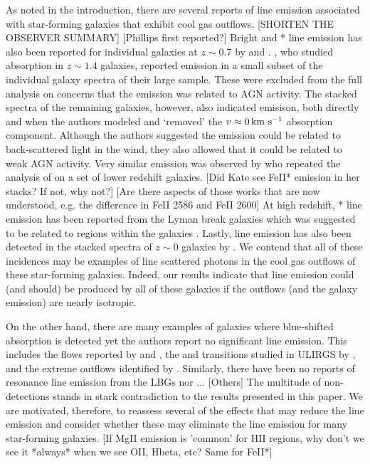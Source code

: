 \documentclass[12pt,preprint]{aastex}
\begin{document}
As noted in the introduction, there are several reports of line
emission associated with star-forming galaxies that exhibit cool gas outflows.  
[SHORTEN THE OBSERVER SUMMARY]
[Phillips first reported?]
Bright  and * line emission has also been
reported for individual galaxies at $z \sim 0.7$ by \cite{rubin+10b}
and \cite{rubin+10c}.   
\cite{wcp+09}, who
studied  absorption in $z \sim 1.4$ galaxies, reported
 emission in a small subset of the individual galaxy
spectra of their large sample.  These were excluded from the full
analysis on concerns that the emission was related to AGN activity.
The stacked spectra of the remaining galaxies, however, also indicated
 emisison, both directly and when the authors modeled and
`removed' the $v \approx 0\, {\rm km~s^{-1}}$ absorption component.  Although the
authors suggested the emission could be related to back-scattered
light in the wind, they also allowed that it could be related to weak
AGN activity.   Very similar  emission was observed by
\cite{rubin+10b} who repeated the analysis of \cite{wcp+09} on a set
of lower redshift galaxies. 
[Did Kate see FeII* emission in her stacks? If not, why not?]
[Are there aspects of those works that are now understood, e.g. the
difference in FeII 2586 and FeII 2600]
At high redshift, * line emission has been reported from
the Lyman break galaxies which was suggested to be
related to  regions within the galaxies \citep{shapley03}.
Lastly,  line emission has also been detected in the
stacked spectra of $z \sim 0$ galaxies by \cite{chen}.  
We contend that all of these incidences may be examples of line
scattered photons in the cool gas outflows of these star-forming
galaxies.  Indeed, our results indicate that line emission could (and
should) be produced by all of these galaxies if the outflows (and the
galaxy emission) are nearly isotropic.

On the other hand,
there are many examples of galaxies where blue-shifted absorption is
detected yet the authors report no significant line emission.  This
includes the  flows reported by \cite{rupke} and
\cite{martin}, the  and  transitions studied in
ULIRGS by \cite{mb10}, and the extreme  outflows identified
by \cite{tremonti}.  Similarly, there have been no reports of
resonance line emission from the LBGs nor ... [Others]
The multitude of non-detections stands in stark contradiction to the
results presented in this paper.   We are motivated, therefore, to
reassess several of the effects that may reduce the line emission
and consider whether these may eliminate the line emission for many
star-forming galaxies.  [If MgII emission is 'common' for HII regions,
why don't we see it *always* when we see OII, Hbeta, etc?  Same for
FeII*]
\end{document}
